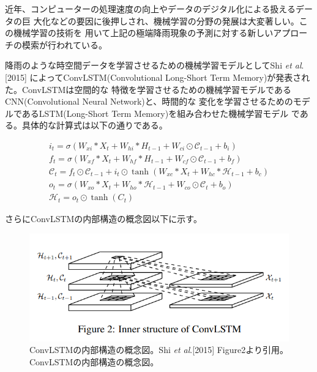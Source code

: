 近年、コンピューターの処理速度の向上やデータのデジタル化による扱えるデータの巨
大化などの要因に後押しされ、機械学習の分野の発展は大変著しい。この機械学習の技術を
用いて上記の極端降雨現象の予測に対する新しいアプローチの模索が行われている。

降雨のような時空間データを学習させるための機械学習モデルとしてShi \textit{et al}.[2015]
によってConvLSTM(Convolutional Long-Short Term Memory)が発表された。ConvLSTMは空間的な
特徴を学習させるための機械学習モデルであるCNN(Convolutional Neural Network)と、時間的な
変化を学習させるためのモデルであるLSTM(Long-Short Term Memory)を組み合わせた機械学習モデル
である。具体的な計算式は以下の通りである。

\begin{gather}
  i_{t} = \sigma\left(W_{xi} * X_{t} + W_{hi} * H_{t−1} + W_{ci} \odot \mathcal{C}_{t−1} + b_{i}\right) \\ 
  f_{t} = \sigma\left(W_{xf} * X_{t} + W_{hf} * H_{t−1} + W_{cf} \odot \mathcal{C}_{t−1} + b_{f}\right) \\
  \mathcal{C}_{t} = f_{t} \odot \mathcal{C}_{t−1} + i_{t} \odot \tanh\left(W_{xc} * X_{t} + W_{hc} * \mathcal{H}_{t−1} + b_{c}\right) \\
  o_{t} = \sigma\left(W_{xo} * X_{t} + W_{ho} * \mathcal{H}_{t−1} + W_{co} \odot \mathcal{C}_{t} + b_{o}\right) \\
  \mathcal{H}_{t} = o_{t} \odot \tanh\left(C_{t}\right) 
\end{gather}

さらにConvLSTMの内部構造の概念図以下に示す。

\begin{figure}[H]
\begin{center}
\includegraphics[width=0.8\linewidth]{fig/intro/inner-structure-of-convlstm.png}
\caption{ConvLSTMの内部構造の概念図。Shi \textit{et al}.[2015] Figure2より引用。ConvLSTMの内部構造の概念図。}
\end{center}
\end{figure}

